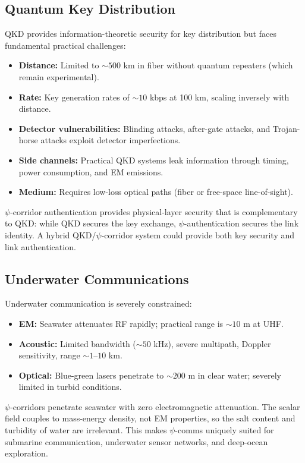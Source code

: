 \documentclass[twocolumn,superscriptaddress,prd,nofootinbib]{revtex4-2}
\begin{document}
\subsection{Quantum Key Distribution}

QKD provides information-theoretic security for key distribution but
faces fundamental practical challenges:
\begin{itemize}
\item \textbf{Distance:} Limited to $\sim 500$ km in fiber without
quantum repeaters (which remain experimental).
\item \textbf{Rate:} Key generation rates of $\sim 10$ kbps at
100 km, scaling inversely with distance.
\item \textbf{Detector vulnerabilities:} Blinding attacks, after-gate
attacks, and Trojan-horse attacks exploit detector imperfections.
\item \textbf{Side channels:} Practical QKD systems leak information
through timing, power consumption, and EM emissions.
\item \textbf{Medium:} Requires low-loss optical paths (fiber or
free-space line-of-sight).
\end{itemize}

$\psi$-corridor authentication provides physical-layer security that
is complementary to QKD: while QKD secures the key exchange,
$\psi$-authentication secures the link identity.
A hybrid QKD/$\psi$-corridor system could provide both key security and
link authentication.

\subsection{Underwater Communications}

Underwater communication is severely constrained:
\begin{itemize}
\item \textbf{EM:} Seawater attenuates RF rapidly; practical range is
$\sim 10$ m at UHF.
\item \textbf{Acoustic:} Limited bandwidth ($\sim 50$ kHz), severe
multipath, Doppler sensitivity, range $\sim 1$--$10$ km.
\item \textbf{Optical:} Blue-green lasers penetrate to $\sim 200$ m in
clear water; severely limited in turbid conditions.
\end{itemize}

$\psi$-corridors penetrate seawater with zero electromagnetic attenuation.
The scalar field couples to mass-energy density, not EM properties, so
the salt content and turbidity of water are irrelevant.
This makes $\psi$-comms uniquely suited for submarine communication,
underwater sensor networks, and deep-ocean exploration.
\end{document}
